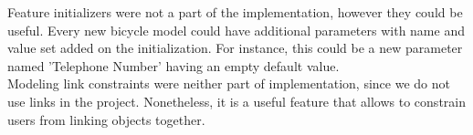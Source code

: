 \noindent Feature initializers were not a part of the implementation, however
they could be useful. Every new bicycle model could have additional parameters
with name and value set added on the initialization. For instance, this could be
a new parameter named 'Telephone Number' having an empty default value.\\
Modeling link constraints were neither part of implementation, since we do
not use links in the project. Nonetheless, it is a useful feature that allows
to constrain users from linking objects together. \\